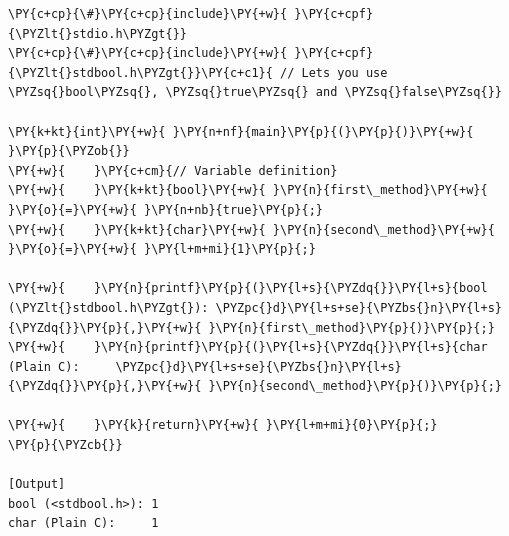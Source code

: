 \begin{Verbatim}[label=\makebox{\url{https://github.com/lucabaldini/cmepda/tree/master/slides/latex/snippets/booleans_in_c.c}},commandchars=\\\{\}]
\PY{c+cp}{\#}\PY{c+cp}{include}\PY{+w}{ }\PY{c+cpf}{\PYZlt{}stdio.h\PYZgt{}}
\PY{c+cp}{\#}\PY{c+cp}{include}\PY{+w}{ }\PY{c+cpf}{\PYZlt{}stdbool.h\PYZgt{}}\PY{c+c1}{ // Lets you use \PYZsq{}bool\PYZsq{}, \PYZsq{}true\PYZsq{} and \PYZsq{}false\PYZsq{}}

\PY{k+kt}{int}\PY{+w}{ }\PY{n+nf}{main}\PY{p}{(}\PY{p}{)}\PY{+w}{ }\PY{p}{\PYZob{}}
\PY{+w}{    }\PY{c+cm}{// Variable definition}
\PY{+w}{    }\PY{k+kt}{bool}\PY{+w}{ }\PY{n}{first\_method}\PY{+w}{ }\PY{o}{=}\PY{+w}{ }\PY{n+nb}{true}\PY{p}{;}
\PY{+w}{    }\PY{k+kt}{char}\PY{+w}{ }\PY{n}{second\_method}\PY{+w}{ }\PY{o}{=}\PY{+w}{ }\PY{l+m+mi}{1}\PY{p}{;}

\PY{+w}{    }\PY{n}{printf}\PY{p}{(}\PY{l+s}{\PYZdq{}}\PY{l+s}{bool (\PYZlt{}stdbool.h\PYZgt{}): \PYZpc{}d}\PY{l+s+se}{\PYZbs{}n}\PY{l+s}{\PYZdq{}}\PY{p}{,}\PY{+w}{ }\PY{n}{first\_method}\PY{p}{)}\PY{p}{;}
\PY{+w}{    }\PY{n}{printf}\PY{p}{(}\PY{l+s}{\PYZdq{}}\PY{l+s}{char (Plain C):     \PYZpc{}d}\PY{l+s+se}{\PYZbs{}n}\PY{l+s}{\PYZdq{}}\PY{p}{,}\PY{+w}{ }\PY{n}{second\_method}\PY{p}{)}\PY{p}{;}

\PY{+w}{    }\PY{k}{return}\PY{+w}{ }\PY{l+m+mi}{0}\PY{p}{;}
\PY{p}{\PYZcb{}}

[Output]
bool (<stdbool.h>): 1
char (Plain C):     1
\end{Verbatim}